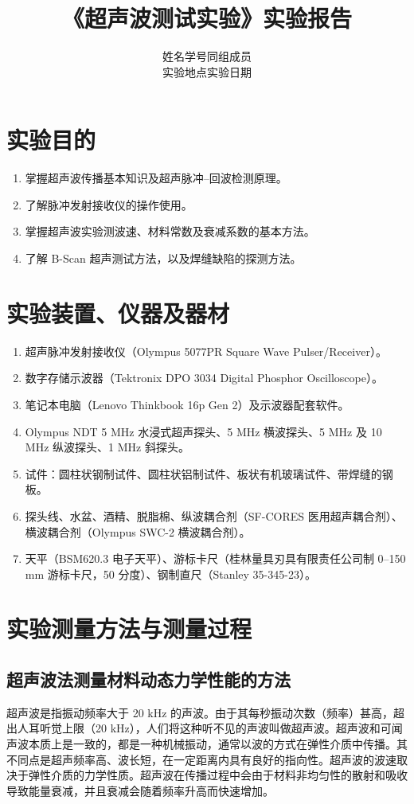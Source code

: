 \documentclass[UTF8,a4paper,12pt]{ctexart}
\title{《超声波测试实验》实验报告}
\author{姓名\blank[2.5cm] \quad 学号\blank[3cm] \quad 同组成员\blank[4cm]\\[1em]
实验地点\blank[3cm] \quad 实验日期\blank[4cm]}
\date{}
\numberwithin{equation}{section}
\begin{document}
\maketitle
\tableofcontents
\clearpage

\section{实验目的}
\begin{enumerate}
  \item 掌握超声波传播基本知识及超声脉冲--回波检测原理。
  \item 了解脉冲发射接收仪的操作使用。
  \item 掌握超声波实验测波速、材料常数及衰减系数的基本方法。
  \item 了解 B-Scan 超声测试方法，以及焊缝缺陷的探测方法。
\end{enumerate}

\section{实验装置、仪器及器材}
\begin{enumerate}
  \item 超声脉冲发射接收仪（Olympus 5077PR Square Wave Pulser/Receiver）。
  \item 数字存储示波器（Tektronix DPO 3034 Digital Phosphor Oscilloscope）。
  \item 笔记本电脑（Lenovo Thinkbook 16p Gen 2）及示波器配套软件。
  \item Olympus NDT 5 MHz 水浸式超声探头、5 MHz 横波探头、5 MHz 及 10 MHz 纵波探头、1 MHz 斜探头。
  \item 试件：圆柱状钢制试件、圆柱状铝制试件、板状有机玻璃试件、带焊缝的钢板。
  \item 探头线、水盆、酒精、脱脂棉、纵波耦合剂（SF-CORES 医用超声耦合剂）、横波耦合剂（Olympus SWC-2 横波耦合剂）。
  \item 天平（BSM620.3 电子天平）、游标卡尺（桂林量具刃具有限责任公司制 0--150 mm 游标卡尺，50 分度）、钢制直尺（Stanley 35-345-23）。
\end{enumerate}

\section{实验测量方法与测量过程}
\subsection{超声波法测量材料动态力学性能的方法}
超声波是指振动频率大于 20 kHz 的声波。由于其每秒振动次数（频率）甚高，超出人耳听觉上限（20 kHz），人们将这种听不见的声波叫做超声波。超声波和可闻声波本质上是一致的，都是一种机械振动，通常以波的方式在弹性介质中传播。其不同点是超声频率高、波长短，在一定距离内具有良好的指向性。超声波的波速取决于弹性介质的力学性质。超声波在传播过程中会由于材料非均匀性的散射和吸收导致能量衰减，并且衰减会随着频率升高而快速增加。
\end{document}
